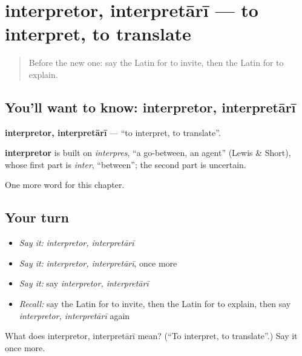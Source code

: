 \section[interpretor, interpretārī]{interpretor, interpretārī — to interpret, to translate}

\label{lesson:LA-C197-interpretor}



\begin{quote}
Before the new one: say the Latin for to invite, then the Latin for to explain.
\end{quote}

\subsection*{You'll want to know: interpretor, interpretārī}
\textbf{interpretor, interpretārī} — \textquotedblleft{}to interpret, to translate\textquotedblright{}.

\begin{cousinweb}
\textbf{interpretor} is built on \emph{interpres}, \textquotedblleft{}a go-between, an agent\textquotedblright{} (Lewis \& Short), whose first part is \emph{inter}, \textquotedblleft{}between\textquotedblright{}; the second part is uncertain.
\end{cousinweb}

\begin{grammarlens}[title={What you've built}]
One more word for this chapter.
\end{grammarlens}

\subsection*{Your turn}
\begin{itemize}
\raggedright
  \item \emph{Say it:} \emph{interpretor, interpretārī}
  \item \emph{Say it:} \emph{interpretor, interpretārī}, once more
  \item \emph{Say it:} say \emph{interpretor, interpretārī}
  \item \emph{Recall:} say the Latin for to invite, then the Latin for to explain, then say \emph{interpretor, interpretārī} again
\end{itemize}

\begin{tcolorbox}[breakable,colback=teal!4,colframe=teal!35!black,title={Before you move on}]
What does interpretor, interpretārī mean? (\textquotedblleft{}To interpret, to translate\textquotedblright{}.) Say it once more.
\end{tcolorbox}

